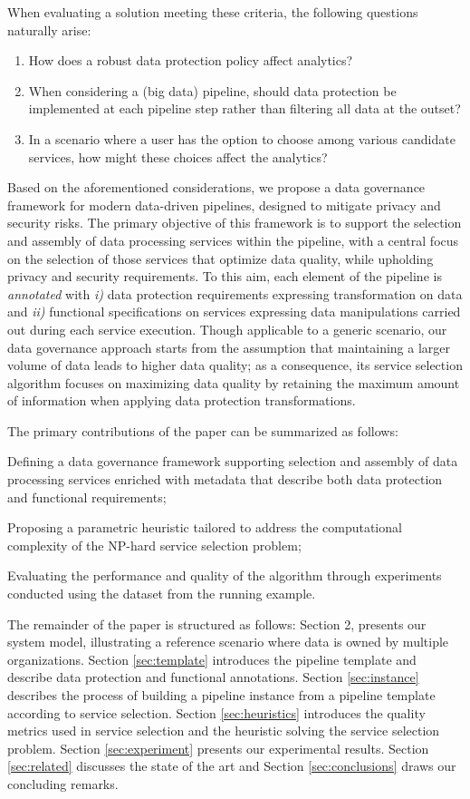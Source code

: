 When evaluating a solution meeting these criteria, the following questions naturally arise:
\begin{enumerate}
\item How does a robust data protection policy affect analytics?
\item When considering a (big data) pipeline, should data protection be implemented at each pipeline step rather than filtering all data at the outset? 
\item In a scenario where a user has the option to choose among various candidate services, how might these choices affect the analytics?
\end{enumerate}

Based on the aforementioned considerations, we propose a data governance framework for modern data-driven pipelines, designed to mitigate privacy and security risks. The primary objective of this framework is to support the selection and assembly of data processing services within the pipeline, with a central focus on the selection of those services that optimize data quality, while upholding privacy and security requirements. 
To this aim, each element of the pipeline is \textit{annotated} with \emph{i)} data protection requirements expressing transformation on data and \emph{ii)} functional specifications on services expressing data manipulations carried out during each service execution. 
Though applicable to a generic scenario, our data governance approach starts from the assumption that maintaining a larger volume of data leads to higher data quality; as a consequence, its service selection algorithm focuses on maximizing data quality by retaining the maximum amount of information when applying data protection transformations. 

The primary contributions of the paper can be summarized as follows:
\begin{enumerate*}
  \item Defining a data governance framework supporting selection and assembly of data processing services enriched with metadata that describe both data protection and functional requirements;
  \item Proposing a parametric heuristic tailored to address the computational complexity of the NP-hard service selection problem;
  \item Evaluating the performance and quality of the algorithm through experiments conducted using the dataset from the running example.
\end{enumerate*}

The remainder of the paper is structured as follows: Section 2, presents our system model, illustrating a reference scenario where data is owned by multiple organizations. Section \ref{sec:template} introduces the pipeline template and describe data protection and functional annotations. Section \ref{sec:instance} describes the process of building a pipeline instance from a pipeline template according to service selection. Section \ref{sec:heuristics} introduces the quality metrics used in service selection and the heuristic solving the service selection problem. Section \ref{sec:experiment} presents our experimental results. Section \ref{sec:related} discusses the state of the art and Section \ref{sec:conclusions} draws our concluding remarks.